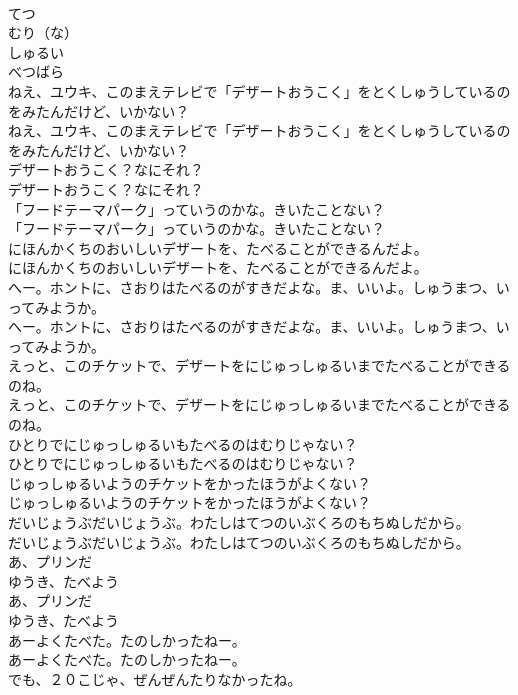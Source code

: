 \documentclass[8pt]{extreport}
\begin{document}
\begin{CJK}{UTF8}{min}
\\	てつ
\\	むり（な）
\\	しゅるい
\\	べつばら
\\	ねえ、ユウキ、このまえテレビで「デザートおうこく」をとくしゅうしているのをみたんだけど、いかない？
\\	ねえ、ユウキ、このまえテレビで「デザートおうこく」をとくしゅうしているのをみたんだけど、いかない？
\\	デザートおうこく？なにそれ？
\\	デザートおうこく？なにそれ？
\\	「フードテーマパーク」っていうのかな。きいたことない？
\\	「フードテーマパーク」っていうのかな。きいたことない？
\\	にほんかくちのおいしいデザートを、たべることができるんだよ。
\\	にほんかくちのおいしいデザートを、たべることができるんだよ。
\\	へー。ホントに、さおりはたべるのがすきだよな。ま、いいよ。しゅうまつ、いってみようか。
\\	へー。ホントに、さおりはたべるのがすきだよな。ま、いいよ。しゅうまつ、いってみようか。
\\	えっと、このチケットで、デザートをにじゅっしゅるいまでたべることができるのね。
\\	えっと、このチケットで、デザートをにじゅっしゅるいまでたべることができるのね。
\\	ひとりでにじゅっしゅるいもたべるのはむりじゃない？
\\	ひとりでにじゅっしゅるいもたべるのはむりじゃない？
\\	じゅっしゅるいようのチケットをかったほうがよくない？
\\	じゅっしゅるいようのチケットをかったほうがよくない？
\\	だいじょうぶだいじょうぶ。わたしはてつのいぶくろのもちぬしだから。
\\	だいじょうぶだいじょうぶ。わたしはてつのいぶくろのもちぬしだから。
\\	あ、プリンだ
\\	ゆうき、たべよう
\\	あ、プリンだ
\\	ゆうき、たべよう
\\	あーよくたべた。たのしかったねー。
\\	あーよくたべた。たのしかったねー。
\\	でも、２０こじゃ、ぜんぜんたりなかったね。

\end{CJK}
\end{document}
